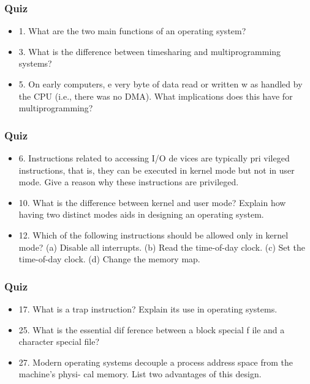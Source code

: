 
\begin{frame}
    \frametitle{Quiz}
    
    \begin{itemize}
        \item
        1. What are the two main functions of an operating system?
        \item
        3. What is the difference between timesharing and multiprogramming systems?
        \item
        5. On early computers, e very byte of data read or written w as handled by the CPU (i.e.,
        there was no DMA). What implications does this have for multiprogramming?
    \end{itemize}    

\end{frame}

\begin{frame}
    \frametitle{Quiz}

        \begin{itemize}
        \item
        6. Instructions related to accessing I/O de vices are typically pri vileged instructions, that
        is, they can be executed in kernel mode but not in user mode. Give a reason why these
        instructions are privileged.
        \item 
        10. What is the difference between kernel and user mode? Explain how having two distinct
        modes aids in designing an operating system.
        \item 
        12. Which of the following instructions should be allowed only in kernel mode?
        (a) Disable all interrupts.
        (b) Read the time-of-day clock.
        (c) Set the time-of-day clock.
        (d) Change the memory map.
    \end{itemize}    

\end{frame}

\begin{frame}
    \frametitle{Quiz}
    
    \begin{itemize}
        \item 
        17. What is a trap instruction? Explain its use in operating systems.
        \item 
        25. What is the essential dif ference between a block special f ile and a character special
        file?
        \item
        27. Modern operating systems decouple a process address space from the machine’s physi-
        cal memory. List two advantages of this design.
    \end{itemize}    

\end{frame}


